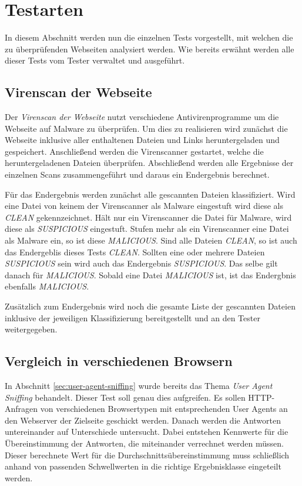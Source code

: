 \section{Testarten}
\label{sec:konzept-testarten}

In diesem Abschnitt werden nun die einzelnen Tests vorgestellt, mit welchen die zu überprüfenden
Webseiten analysiert werden. Wie bereits erwähnt werden alle dieser Tests vom Tester verwaltet und
ausgeführt.

\subsection{Virenscan der Webseite}

Der \textit{Virenscan der Webseite} nutzt verschiedene Antivirenprogramme um die Webseite auf
Malware zu überprüfen.
Um dies zu realisieren wird zunächst die Webseite inklusive aller enthaltenen Dateien und Links
heruntergeladen und gespeichert. Anschließend werden die Virenscanner gestartet, welche die
heruntergeladenen Dateien überprüfen. Abschließend werden alle Ergebnisse der einzelnen Scans
zusammengeführt und daraus ein Endergebnis berechnet.

Für das Endergebnis werden zunächst alle gescannten Dateien klassifiziert. Wird eine Datei von
keinem der Virenscanner als Malware eingestuft wird diese als \textit{CLEAN} gekennzeichnet.
Hält nur ein Virenscanner die Datei für Malware, wird diese als \textit{SUSPICIOUS}
eingestuft. Stufen mehr als ein Virenscanner eine Datei als Malware ein, so ist diese
\textit{MALICIOUS}.
Sind alle Dateien \textit{CLEAN}, so ist auch das Endergeblis dieses Tests
\textit{CLEAN}. Sollten eine oder mehrere Dateien \textit{SUSPICIOUS} sein wird auch das Endergebnis
\textit{SUSPICIOUS}. Das selbe gilt danach für \textit{MALICIOUS}. Sobald eine Datei
\textit{MALICIOUS} ist, ist das Endergbnis ebenfalls \textit{MALICIOUS}.

Zusätzlich zum Endergebnis wird noch die gesamte Liste der gescannten Dateien inklusive der
jeweiligen Klassifizierung bereitgestellt und an den Tester weitergegeben.

\subsection{Vergleich in verschiedenen Browsern}

In Abschnitt \ref{sec:user-agent-sniffing} wurde bereits das Thema \textit{User Agent Sniffing}
behandelt.
Dieser Test soll genau dies aufgreifen.
Es sollen \acs{HTTP}-Anfragen von verschiedenen Browsertypen mit entsprechenden User Agents an den
Webserver der Zielseite geschickt werden.
Danach werden die Antworten untereinander auf Unterschiede untersucht. Dabei entstehen Kennwerte
für die Übereinstimmung der Antworten, die miteinander verrechnet werden müssen.
Dieser berechnete Wert für die Durchschnittsübereinstimmung muss schließlich anhand von passenden
Schwellwerten in die richtige Ergebnisklasse eingeteilt werden.

